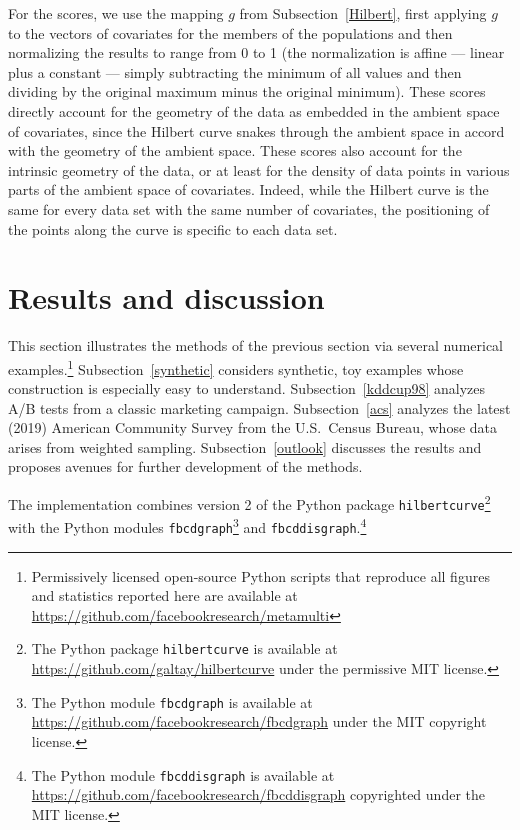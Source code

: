 \documentclass{article}
\begin{document}
For the scores, we use the mapping $g$ from Subsection~\ref{Hilbert},
first applying $g$ to the vectors of covariates
for the members of the populations and then normalizing the results
to range from 0 to 1 (the normalization is affine --- linear plus a constant
--- simply subtracting the minimum of all values
and then dividing by the original maximum minus the original minimum).
These scores directly account for the geometry of the data
as embedded in the ambient space of covariates, since the Hilbert curve snakes
through the ambient space in accord with the geometry of the ambient space.
These scores also account for the intrinsic geometry of the data, or
at least for the density of data points in various parts of the ambient space
of covariates. Indeed, while the Hilbert curve is the same for every data set
with the same number of covariates, the positioning of the points
along the curve is specific to each data set.



\section{Results and discussion}
\label{results}

This section illustrates the methods of the previous section
via several numerical examples.\footnote{Permissively licensed
open-source Python scripts that reproduce all figures and statistics
reported here are available at
\url{https://github.com/facebookresearch/metamulti}}
Subsection~\ref{synthetic} considers synthetic, toy examples
whose construction is especially easy to understand.
Subsection~\ref{kddcup98} analyzes A/B tests from a classic marketing campaign.
Subsection~\ref{acs} analyzes the latest (2019) American Community Survey
from the U.S.\ Census Bureau, whose data arises from weighted sampling.
Subsection~\ref{outlook} discusses the results and proposes avenues
for further development of the methods.

The implementation combines version 2 of the Python package
{\tt hilbertcurve}\footnote{The Python package {\tt hilbertcurve}
is available at \url{https://github.com/galtay/hilbertcurve}
under the permissive MIT license.} with the Python modules
{\tt fbcdgraph}\footnote{The Python module {\tt fbcdgraph}
is available at \url{https://github.com/facebookresearch/fbcdgraph}
under the MIT copyright license.} and
{\tt fbcddisgraph}.\footnote{The Python module {\tt fbcddisgraph}
is available at \url{https://github.com/facebookresearch/fbcddisgraph}
copyrighted under the MIT license.}
\end{document}
